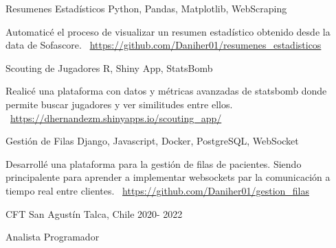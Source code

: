 \documentclass[]{awesome-cv}
\begin{document}
\begin{cventries}
	\vspace{-3mm}
	\cventry
	{}
	{Resumenes Estadísticos \vspace{-5mm}}
	{Python, Pandas, Matplotlib, WebScraping \vspace{-5mm}}
	{}
	{\begin{cvsectionnormaltext}
		\item {Automaticé el proceso de visualizar un resumen estadístico obtenido desde la data de Sofascore. 
		\newline \faLink\ \href{https://github.com/Daniher01/resumenes_estadisticos}{https://github.com/Daniher01/resumenes\_estadisticos}}
	\end{cvsectionnormaltext}}

	\vspace{-3mm}
	\cventry
	{}
	{Scouting de Jugadores \vspace{-5mm}}
	{R, Shiny App, StatsBomb \vspace{-5mm}}
	{}
	{\begin{cvsectionnormaltext}
		\item {Realicé una plataforma con datos y métricas avanzadas de statsbomb donde permite buscar jugadores y ver similitudes entre ellos.
		\newline \faLink\ \href{https://dhernandezm.shinyapps.io/scouting_app/}{https://dhernandezm.shinyapps.io/scouting\_app/}}
	\end{cvsectionnormaltext}}
	
	\vspace{-3mm}
	\cventry
	{}
	{Gestión de Filas \vspace{-5mm}}
	{Django, Javascript, Docker, PostgreSQL, WebSocket \vspace{-5mm}}
	{}
	{\begin{cvsectionnormaltext}
		\item {Desarrollé una plataforma para la gestión de filas de pacientes. Siendo principalente para aprender a implementar websockets par la comunicación a tiempo real entre clientes. 
		\newline \faLink\ \href{https://github.com/Daniher01/gestion_filas}{https://github.com/Daniher01/gestion\_filas}}
	\end{cvsectionnormaltext}}
	
	\vspace{-5mm}
	
\end{cventries}

\vspace{8mm}
\begin{cventries}
	\vspace{-3mm}
	\cventry
	{}
	{CFT San Agustín \vspace{-5mm}}
	{Talca, Chile \vspace{-5mm}}
	{2020- 2022 \vspace{-5mm}}
	{\begin{cvsectionnormaltext} 
		\item{Analista Programador}
	\end{cvsectionnormaltext}}
\end{cventries}
\end{document}

